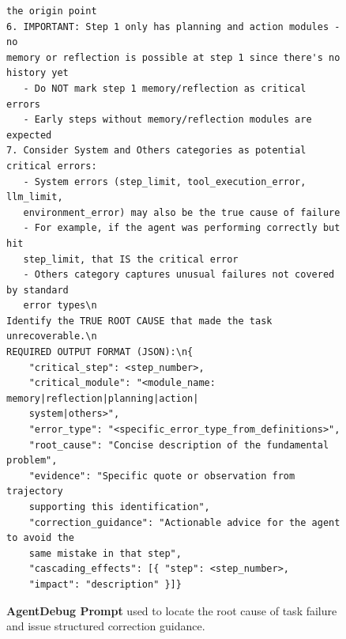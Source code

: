 \begin{figure}[htbp]
\begin{tcolorbox}
\begin{verbatim}
the origin point
6. IMPORTANT: Step 1 only has planning and action modules - no 
memory or reflection is possible at step 1 since there's no history yet
   - Do NOT mark step 1 memory/reflection as critical errors
   - Early steps without memory/reflection modules are expected
7. Consider System and Others categories as potential critical errors:
   - System errors (step_limit, tool_execution_error, llm_limit, 
   environment_error) may also be the true cause of failure
   - For example, if the agent was performing correctly but hit 
   step_limit, that IS the critical error
   - Others category captures unusual failures not covered by standard 
   error types\n
Identify the TRUE ROOT CAUSE that made the task unrecoverable.\n
REQUIRED OUTPUT FORMAT (JSON):\n{
    "critical_step": <step_number>,
    "critical_module": "<module_name: memory|reflection|planning|action|
    system|others>",
    "error_type": "<specific_error_type_from_definitions>",
    "root_cause": "Concise description of the fundamental problem",
    "evidence": "Specific quote or observation from trajectory 
    supporting this identification",
    "correction_guidance": "Actionable advice for the agent to avoid the 
    same mistake in that step",
    "cascading_effects": [{ "step": <step_number>, 
    "impact": "description" }]}
\end{verbatim}
\end{tcolorbox}
\vspace{-1em}
\caption{\textbf{AgentDebug Prompt} used to locate the root cause of task failure and issue structured correction guidance.}
\label{fig:agentdebug_prompt}
\end{figure}








